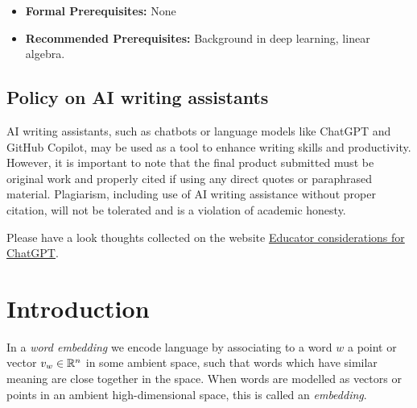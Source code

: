 \documentclass[11pt, a4paper]{amsart}
\begin{document}
\begin{itemize}
\begin{itemize}
        \item Submission of a  \LaTeX-file and compiled PDF of an extended abstract:
        \begin{itemize}
        	\item No more than 2 pages.
        	\item Using the \href{https://www.overleaf.com/latex/templates/acl-2020-proceedings-template/zsrkcwjptpcd}{ACL Overleaf template}.
        	\item Including relevant references to scientific literature.
        \end{itemize}
    \end{itemize}
    \item \textbf{Formal Prerequisites:} None
    \item \textbf{Recommended Prerequisites:}
    Background in deep learning,
    linear algebra.
\end{itemize}

\subsection*{Policy on AI writing assistants}

AI writing assistants, such as chatbots or language models like ChatGPT \cite{ChatGPT} and GitHub Copilot, may be used as a tool to enhance writing skills and productivity.
However, it is important to note that the final product submitted must be original work and properly cited if using any direct quotes or paraphrased material.
Plagiarism, including use of AI writing assistance without proper citation, will not be tolerated and is a violation of academic honesty.

Please have a look thoughts collected on the website \href{https://platform.openai.com/docs/chatgpt-education}{Educator considerations for ChatGPT}.

\clearpage
\section{Introduction}
\label{sec:intro}

In a \emph{word embedding} we encode language by associating to a word $w$ a point or vector $v_{w} \in \mathbb{R}^{n}$ in some ambient space, such that words which have similar meaning are close together in the space.
When words are modelled as vectors or points in an ambient high-dimensional space, this is called an \emph{embedding}.
\end{document}
